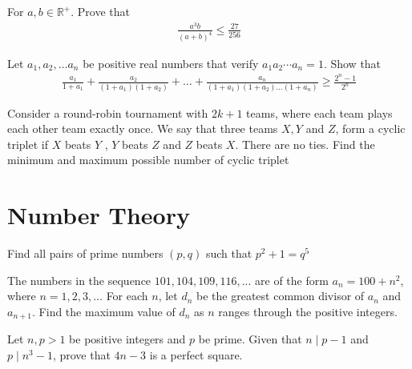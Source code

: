 \begin{problem}[Q][5][Pathfinder]
    For $a,b \in \mathbb{R}^+$. Prove that 
    \begin{align*}
        \frac{a^3b}{(a+b)^4} \leq \frac{27}{256}
    \end{align*}
\end{problem}

\begin{problem}
    Let $a_1,a_2,\ldots a_n$ be positive real numbers that verify $a_1a_2 \cdots a_n=1$. Show that 
    \begin{align*}
        \frac{a_1}{1+a_1}+\frac{a_2}{(1+a_1)(1+a_2)}+\ldots+\frac{a_n}{(1+a_1)(1+a_2) \ldots (1+a_n)} \geq \frac{2^n-1}{2^n}
    \end{align*}
\end{problem}

\begin{problem}
    Consider a round-robin tournament with $2k + 1$ teams, where each team plays each other team exactly once. We say that three teams $X, Y$ and $Z$, form a cyclic triplet if $X$ beats $Y$ , $Y$ beats $Z$ and $Z$ beats $X$. There are no ties. Find the minimum and maximum possible number of cyclic triplet
\end{problem}


\newpage
\thispagestyle{firstpageheader}
\section{Number Theory}

\begin{problem}[N][1]
    Find all pairs of prime numbers $(p,q)$ such that $p^2+1=q^5$
\end{problem}

\begin{problem}[N][4][AIME 1985]
    The numbers in the sequence $101, 104, 109,116, . . .$ are of the form $a_n = 100+n^2$, where $n = 1,2,3,\ldots$ For each $n$, let $d_n$ be the greatest common divisor of $a_n$ and $a_{n+1}$. Find the maximum value of $d_n$ as $n$ ranges through the positive integers.
\end{problem}


\begin{problem}[N][3][Iran 2005]
    Let $n,p>1$ be positive integers and $p$ be prime. Given that $n \mid p-1$ and $p \mid n^3-1$, prove that $4n-3$ is a perfect square.
\end{problem}

